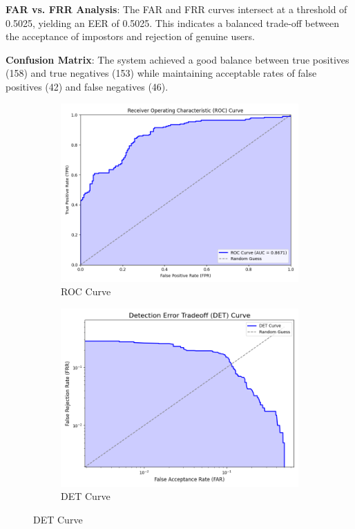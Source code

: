 \textbf{FAR vs. FRR Analysis}: The FAR and FRR curves intersect at a threshold of 0.5025, yielding an EER of 0.5025. This indicates a balanced trade-off between the acceptance of impostors and rejection of genuine users.

\textbf{Confusion Matrix}: The system achieved a good balance between true positives (158) and true negatives (153) while maintaining acceptable rates of false positives (42) and false negatives (46).

\begin{figure}[!ht]
    \centering
    \begin{subfigure}[t]{0.48\columnwidth}
        \includegraphics[width=\textwidth]{./images/plots/ver/roc_curve.png}
        \caption{ROC Curve}
        \label{fig:roc_curve}
    \end{subfigure}
    \hfill
    \begin{subfigure}[t]{0.48\columnwidth}
        \includegraphics[width=\textwidth]{./images/plots/ver/det_curve.png}
        \caption{DET Curve}
        \label{fig:det_curve}
    \end{subfigure}
\end{figure}

